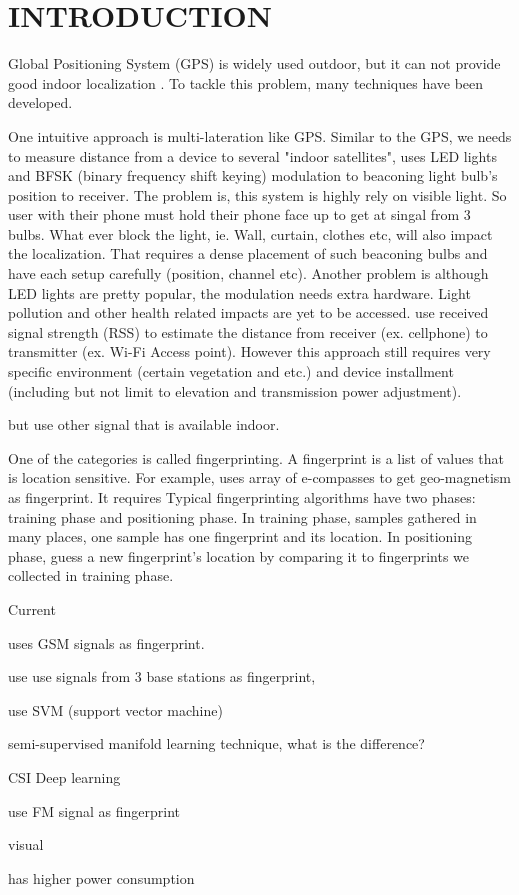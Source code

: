 \chapter{INTRODUCTION}

Global Positioning System (GPS) is widely used outdoor, but it can not provide good indoor localization \cite{pulkkinen2011semi, varshavsky2007gsm}. To tackle this problem, many techniques have been developed. 

One intuitive approach is multi-lateration like GPS. Similar to the GPS, we needs to measure distance from a device to several "indoor satellites", \cite{hu2013pharos} uses LED lights and BFSK (binary frequency shift keying) modulation to beaconing light bulb's position to receiver. The problem is, this system is highly rely on visible light. So user with their phone must hold their phone face up to get at singal from 3 bulbs. What ever block the light, ie. Wall, curtain, clothes etc, will also impact the localization. That requires a dense placement of such beaconing bulbs and have each setup carefully (position, channel etc). Another problem is although LED lights are pretty popular, the modulation needs extra hardware. Light pollution and other health related impacts are yet to be accessed.  \cite{whitehouse2007practical} use received signal strength (RSS) to estimate the distance from receiver (ex. cellphone) to transmitter (ex. Wi-Fi Access point). However this approach still requires very specific environment (certain vegetation and etc.) and device installment (including but not limit to elevation and transmission power adjustment). 

but use other signal that is available indoor.

 
One of the categories is called fingerprinting. A fingerprint is a list of values that is location sensitive. For example, \cite{chung2011indoor} uses array of e-compasses to get geo-magnetism as fingerprint. It requires  Typical fingerprinting algorithms have two phases: training phase and positioning phase. In training phase, samples gathered in many places, one sample has one fingerprint and its location. In positioning phase, guess a new fingerprint's location by comparing it to fingerprints we collected in training phase. 

Current 


\cite{varshavsky2007gsm} uses GSM signals as fingerprint. 

\cite{bahl2000radar} use use signals from 3 base stations as fingerprint,

\cite{brunato2005statistical} use SVM (support vector machine)

\cite{pulkkinen2011semi}semi-supervised manifold learning technique, what is the difference? 

CSI Deep learning

\cite{chen2012fm} use FM signal as fingerprint

visual

has higher power consumption